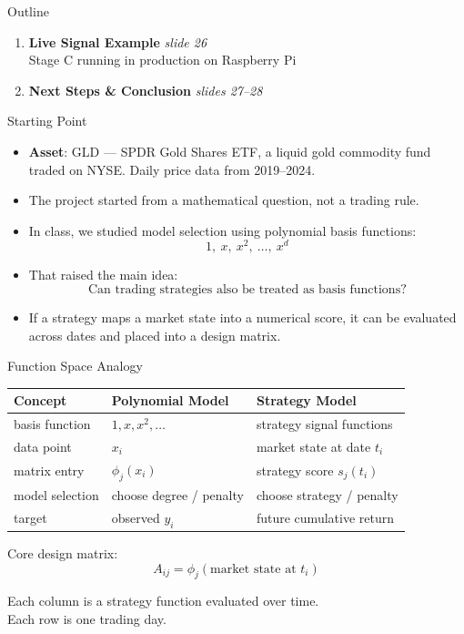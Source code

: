 \documentclass[aspectratio=169]{beamer}
\begin{document}
\begin{frame}{Outline}
\begin{enumerate}
    \item \textbf{Live Signal Example} \hfill \small\textit{slide 26}\\[-0.1em]
      \footnotesize Stage C running in production on Raspberry Pi
    \normalsize\vspace{0.3em}

    \item \textbf{Next Steps \& Conclusion} \hfill \small\textit{slides 27--28}
  \end{enumerate}
\end{frame}

\begin{frame}{Starting Point}
  \begin{itemize}
    \item \textbf{Asset}: GLD — SPDR Gold Shares ETF, a liquid gold commodity fund traded on NYSE.
          Daily price data from 2019--2024.
    \item The project started from a mathematical question, not a trading rule.
    \item In class, we studied model selection using polynomial basis functions:
    \[
      1,\ x,\ x^2,\ \dots,\ x^d
    \]
    \item That raised the main idea:
    \[
      \text{Can trading strategies also be treated as basis functions?}
    \]
    \item If a strategy maps a market state into a numerical score,
          it can be evaluated across dates and placed into a design matrix.
  \end{itemize}
\end{frame}

\begin{frame}{Function Space Analogy}
  \small
  \begin{tabular}{lll}
    \toprule
    Concept & Polynomial Model & Strategy Model \\
    \midrule
    basis function  & \(1, x, x^2, \dots\)   & strategy signal functions \\
    data point      & \(x_i\)                 & market state at date \(t_i\) \\
    matrix entry    & \(\phi_j(x_i)\)         & strategy score \(s_j(t_i)\) \\
    model selection & choose degree / penalty & choose strategy / penalty \\
    target          & observed \(y_i\)        & future cumulative return \\
    \bottomrule
  \end{tabular}

  \vspace{0.6em}
  Core design matrix:
  \[
    A_{ij} = \phi_j(\text{market state at } t_i)
  \]

  \vspace{0.3em}
  Each column is a strategy function evaluated over time.\\
  Each row is one trading day.
\end{frame}
\end{document}
